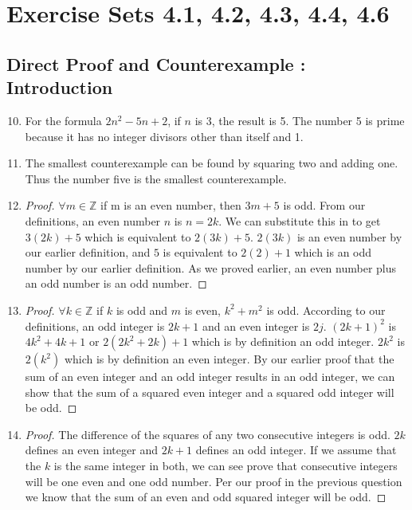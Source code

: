 \documentclass[12pt]{article}
\begin{document}

\setcounter{section}{4}
\section*{Exercise Sets 4.1, 4.2, 4.3, 4.4, 4.6}
\subsection{Direct Proof and Counterexample : Introduction}
\begin{enumerate}
  \setcounter{enumi}{9}
\item %
For the formula $2n^{2}-5n+2$, if $n$ is 3, the result is 5. The
number 5 is prime because it has no integer divisors other than itself
and 1.
  \setcounter{enumi}{11}
\item %
The smallest counterexample can be found by squaring two and adding
one. Thus the number five is the smallest counterexample.
  \setcounter{enumi}{29}
\item %
\begin{proof}
  $\forall m \in \mathbb{Z}$ if m is an even number, then $3m + 5$ is
  odd.
  From our definitions, an even number $n$ is $n = 2k$. We can
  substitute this in to get $3(2k) + 5$ which is equivalent to $2(3k)
  + 5$.
  $2(3k)$ is an even number by our earlier definition, and $5$ is
  equivalent to $2(2)+1$ which is an odd number by our earlier
  definition.
  As we proved earlier, an even number plus an odd number is an odd number.
\end{proof}
\item %
  \begin{proof}
      $\forall k \in \mathbb{Z}$ if $k$ is odd and $m$ is even, $k^{2} + m^{2}$ is odd.
      According to our definitions, an odd integer is $2k + 1$ and an even integer is $2j$.
      $(2k + 1)^{2}$ is $4k^{2} + 4k + 1$ or $2(2k^{2}+2k) + 1$ which is by definition an odd integer.
      $2k^{2}$ is $2(k^{2})$ which is by definition an even integer.
By our earlier proof that the sum of an even integer and an odd integer results in an odd integer, we can show
that the sum of a squared even integer and a squared odd integer will be odd.
  \end{proof}
  \setcounter{enumi}{57}
\item %
  \begin{proof}
    The difference of the squares of any two consecutive integers is odd.
    $2k$ defines an even integer and $2k + 1$ defines an odd integer. If we assume that the $k$ is the same
    integer in both, we can see prove that consecutive integers will be one even and one odd number.
    Per our proof in the previous question we know that the sum of an even and odd squared integer will be odd.
  \end{proof}

\end{enumerate}
\end{document}
